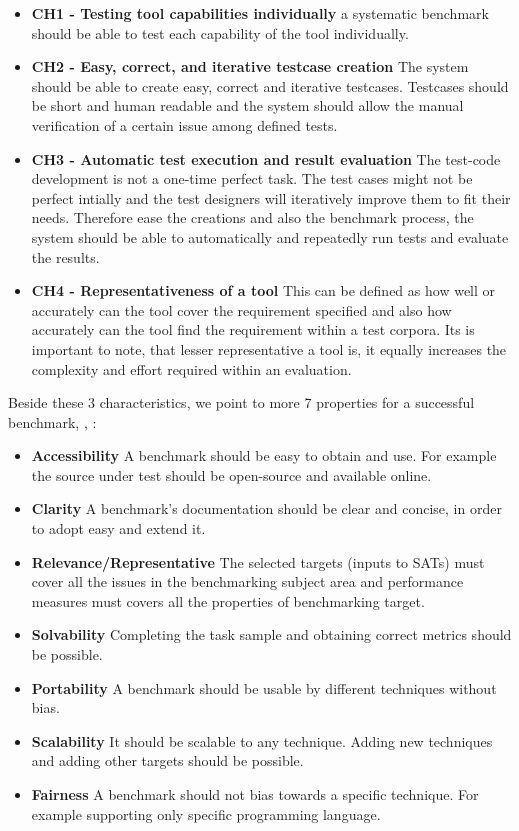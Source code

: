 \documentclass[authoryear,preprint]{sigplanconf}
\begin{document}
\begin{itemize}
	\item \textbf{CH1 - Testing tool capabilities individually} a systematic benchmark should be able to test each capability of the tool individually. 
	\item \textbf{CH2 - Easy, correct, and iterative testcase creation} The system should be able to create easy, correct and iterative testcases. Testcases should be short and human readable and the system should allow the manual verification of a certain issue among defined tests. 
	\item \textbf{CH3 - Automatic test execution and result evaluation} The test-code development is not a one-time perfect task. The test cases might not be perfect intially and the test designers will iteratively improve them to fit their needs. Therefore ease the creations and also the benchmark process, the system should be able to automatically and repeatedly run tests and evaluate the results. 
	\item \textbf{CH4 - Representativeness of a tool} This can be defined as how well or accurately can the tool cover the requirement specified and also how accurately can the tool find the requirement within a test corpora. Its is important to note, that lesser representative a tool is, it equally increases the complexity and effort required within an evaluation.
\end{itemize}

Beside these 3 characteristics, we point to more 7 properties for a successful benchmark, \cite{lu2005bugbench}, \cite{sim2003}:

 \begin{itemize}
	\item \textbf{Accessibility} A benchmark should be easy to obtain and use. For example the  source under test should be open-source and available online. 
	\item \textbf{Clarity} A benchmark’s documentation should be clear and concise, in order to adopt easy and extend it.
	\item \textbf{Relevance/Representative} The selected targets (inputs to SATs) must cover all the issues in the benchmarking subject area  and performance measures must covers all the properties of benchmarking target. 
	\item \textbf{Solvability} Completing the task sample and obtaining correct metrics should be possible. 
	\item \textbf{Portability} A benchmark should be usable by different techniques without bias. 
	\item \textbf{Scalability} It should be scalable to any technique. Adding new techniques and adding other targets should be possible. 
	\item \textbf{Fairness} A benchmark should not bias towards a specific technique. For example supporting only specific programming language.
\end{itemize}
\end{document}
